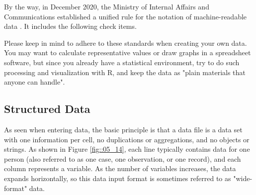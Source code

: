 \documentclass{ltjsbook}
\begin{document}
By the way, in December 2020, the Ministry of Internal Affairs and Communications established a unified rule for the notation of machine-readable data \parencite{soumu}. It includes the following check items.

Please keep in mind to adhere to these standards when creating your own data.
You may want to calculate representative values or draw graphs in a spreadsheet software, but since you already have a statistical environment, try to do such processing and visualization with R, and keep the data as "plain materials that anyone can handle".


\subsection{Structured Data}
As seen when entering data, the basic principle is that a data file is a data set with one information per cell, no duplications or aggregations, and no objects or strings.
As shown in Figure \ref{fig::05_14}, each line typically contains data for one person (also referred to as one case, one observation, or one record), and each column represents a variable. As the number of variables increases, the data expands horizontally, so this data input format is sometimes referred to as "wide-format" data.
\end{document}
